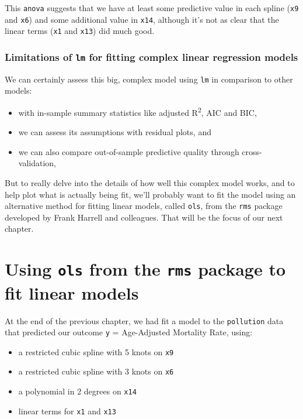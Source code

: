 \documentclass[]{book}
\providecommand{\tightlist}{%
  \setlength{\itemsep}{0pt}\setlength{\parskip}{0pt}}
\theoremstyle{definition}
\theoremstyle{definition}
\theoremstyle{definition}
\theoremstyle{remark}
\begin{document}
This \texttt{anova} suggests that we have at least some predictive value
in each spline (\texttt{x9} and \texttt{x6}) and some additional value
in \texttt{x14}, although it's not as clear that the linear terms
(\texttt{x1} and \texttt{x13}) did much good.

\subsection{\texorpdfstring{Limitations of \texttt{lm} for fitting
complex linear regression
models}{Limitations of lm for fitting complex linear regression models}}\label{limitations-of-lm-for-fitting-complex-linear-regression-models}

We can certainly assess this big, complex model using \texttt{lm} in
comparison to other models:

\begin{itemize}
\tightlist
\item
  with in-sample summary statistics like adjusted R\textsuperscript{2},
  AIC and BIC,
\item
  we can assess its assumptions with residual plots, and
\item
  we can also compare out-of-sample predictive quality through
  cross-validation,
\end{itemize}

But to really delve into the details of how well this complex model
works, and to help plot what is actually being fit, we'll probably want
to fit the model using an alternative method for fitting linear models,
called \texttt{ols}, from the \texttt{rms} package developed by Frank
Harrell and colleagues. That will be the focus of our next chapter.

\chapter{\texorpdfstring{Using \texttt{ols} from the \texttt{rms}
package to fit linear
models}{Using ols from the rms package to fit linear models}}\label{using-ols-from-the-rms-package-to-fit-linear-models}

At the end of the previous chapter, we had fit a model to the
\texttt{pollution} data that predicted our outcome \texttt{y} =
Age-Adjusted Mortality Rate, using:

\begin{itemize}
\tightlist
\item
  a restricted cubic spline with 5 knots on \texttt{x9}
\item
  a restricted cubic spline with 3 knots on \texttt{x6}
\item
  a polynomial in 2 degrees on \texttt{x14}
\item
  linear terms for \texttt{x1} and \texttt{x13}
\end{itemize}
\end{document}
